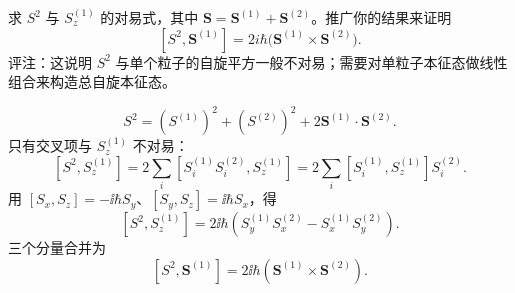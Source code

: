 \begin{question}
求 $S^2$ 与 $S_z^{(1)}$ 的对易式，其中 $\mathbf S=\mathbf S^{(1)}+\mathbf S^{(2)}$。推广你的结果来证明
\[
[S^2,\mathbf S^{(1)}]=2i\hbar\bigl(\mathbf S^{(1)}\times\mathbf S^{(2)}\bigr).
\]
评注：这说明 $S^2$ 与单个粒子的自旋平方一般不对易；需要对单粒子本征态做线性组合来构造总自旋本征态。
\end{question}
\begin{solution}

\[
S^2=(S^{(1)})^2+(S^{(2)})^2+2\mathbf S^{(1)}\cdot\mathbf S^{(2)}.
\]
只有交叉项与 $S_z^{(1)}$ 不对易：
\[
[S^2,S_z^{(1)}]=2\sum_i[S_i^{(1)}S_i^{(2)},S_z^{(1)}]
=2\sum_i[S_i^{(1)},S_z^{(1)}]S_i^{(2)}.
\]
用 $[S_x,S_z]=-\ii\hbar S_y$、$[S_y,S_z]=\ii\hbar S_x$，得
\[
[S^2,S_z^{(1)}]=2\ii\hbar(S_y^{(1)}S_x^{(2)}-S_x^{(1)}S_y^{(2)}).
\]
三个分量合并为
\[
[S^2,\mathbf S^{(1)}]=2\ii\hbar(\mathbf S^{(1)}\times\mathbf S^{(2)}).
\]

\end{solution}

